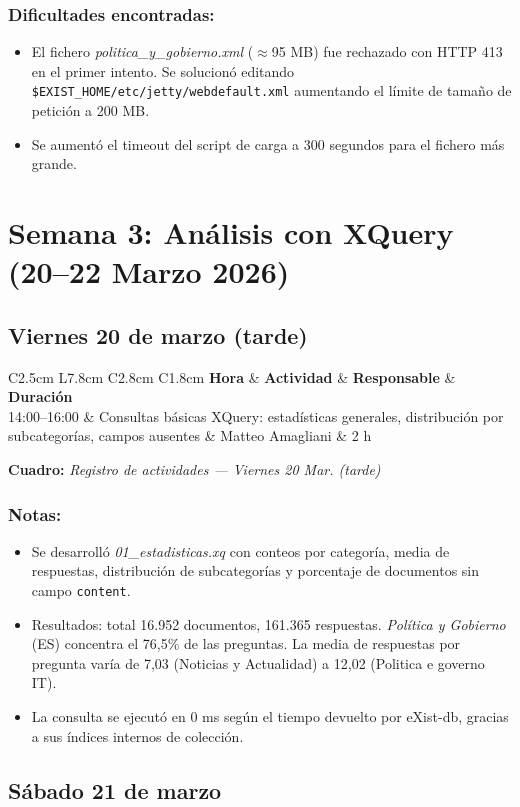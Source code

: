 \documentclass[11pt,a4paper]{article}
\newcommand{\notetitle}[1]{\subsubsection*{#1}}
\newcommand{\activitytable}[2]{%
  \begin{center}
  \begin{tabular}{C{2.5cm} L{7.8cm} C{2.8cm} C{1.8cm}}
  \toprule
  \rowcolor{white}
  \textbf{Hora} & \textbf{Actividad} & \textbf{Responsable} & \textbf{Duración} \\
  \midrule
  #1
  \bottomrule
  \end{tabular}
  \end{center}
  \vspace{-4pt}
  {\small\textbf{Cuadro:} \textit{#2}}
  \vspace{6pt}
}
\begin{document}
\notetitle{Dificultades encontradas:}
\begin{itemize}
  \item El fichero \textit{politica\_y\_gobierno.xml} ($\approx$95 MB) fue rechazado con HTTP 413 en el primer intento. Se solucionó editando \texttt{\$EXIST\_HOME/etc/jetty/webdefault.xml} aumentando el límite de tamaño de petición a 200 MB.
  \item Se aumentó el timeout del script de carga a 300 segundos para el fichero más grande.
\end{itemize}

\newpage

\section{Semana 3: Análisis con XQuery (20--22 Marzo 2026)}

\subsection{Viernes 20 de marzo (tarde)}

\activitytable{%
  14:00--16:00 & Consultas básicas XQuery: estadísticas generales, distribución por subcategorías, campos ausentes & Matteo Amagliani & 2 h \\
}{Registro de actividades --- Viernes 20 Mar. (tarde)}

\notetitle{Notas:}
\begin{itemize}
  \item Se desarrolló \textit{01\_estadisticas.xq} con conteos por categoría, media de respuestas, distribución de subcategorías y porcentaje de documentos sin campo \texttt{content}.
  \item Resultados: total 16.952 documentos, 161.365 respuestas. \textit{Política y Gobierno} (ES) concentra el 76,5\% de las preguntas. La media de respuestas por pregunta varía de 7,03 (Noticias y Actualidad) a 12,02 (Politica e governo IT).
  \item La consulta se ejecutó en 0 ms según el tiempo devuelto por eXist-db, gracias a sus índices internos de colección.
\end{itemize}

\subsection{Sábado 21 de marzo}
\end{document}
